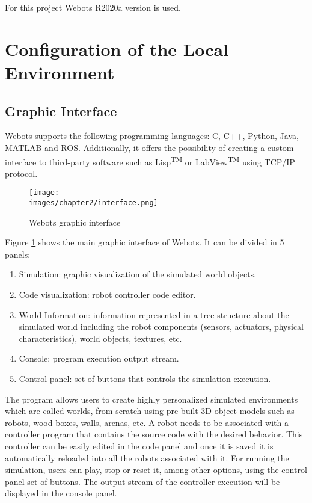 For this project Webots R2020a version is used.

\section{Configuration of the Local Environment}

\subsection{Graphic Interface}
Webots supports the following programming languages: C, C++, Python, Java, MATLAB and ROS. Additionally, it offers the possibility of creating a custom interface to third-party software such as Lisp\textsuperscript{TM} or LabView\textsuperscript{TM} using TCP/IP protocol.

\begin{figure}[h]
	\texttt{[image: \\images/chapter2/interface.png]}
	\caption{Webots graphic interface}
	\label{fig-ch-2:interface}
\end{figure}

Figure \ref{fig-ch-2:interface} shows the main graphic interface of Webots. It can be divided in 5 panels:

\begin{enumerate}
	\item Simulation: graphic visualization of the simulated world objects.
	\item Code visualization: robot controller code editor.
	\item World Information: information represented in a tree structure about the simulated world including the robot components (sensors, actuators, physical characteristics), world objects, textures, etc. 
	\item Console: program execution output stream.
	\item Control panel: set of buttons that controls the simulation execution.
\end{enumerate}

The program allows users to create highly personalized simulated environments which are called worlds, from scratch using pre-built 3D object models such as robots, wood boxes, walls, arenas, etc. A robot needs to be associated with a controller program that contains the source code with the desired behavior. This controller can be easily edited in the code panel and once it is saved it is automatically reloaded into all the robots associated with it. For running the simulation, users can play, stop or reset it, among other options, using the control panel set of buttons. The output stream of the controller execution will be displayed in the console panel. 

